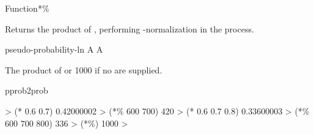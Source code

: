 \documentclass[10pt,twoside,english,pdftex]{article}
\begin{document}
\begin{functiondoc}{Function}{*\%}%
  {\superstar{}
    \returns{} }
%

\fnsyntax

\fnpurpose Returns the product of , performing
-normalization in the process.

\fnpackage {}

\fnmodule {}

\fnargs
\begin{args}{pseudo-probability-ln}
 A  
 A 
\end{args}

\fnreturns The   product of
 or 1000 if no  are supplied.

\begin{alsos}{pprob2prob}
\also[/\%]
\end{alsos}

\fnexamples
\begin{example}
%
\W\supp
  > (* 0.6 0.7)
  0.42000002
  > (*\% 600 700)
  420
  > (* 0.6 0.7 0.8)
  0.33600003
  > (*\% 600 700 800)
  336
  > (*\%)
  1000
  > 
\end{example}

\end{functiondoc}

\end{document}
